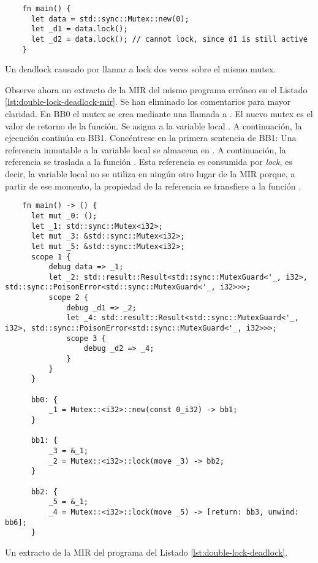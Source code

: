 \begin{listing}[!htb]
  \begin{verbatim}
    fn main() {
      let data = std::sync::Mutex::new(0);
      let _d1 = data.lock();
      let _d2 = data.lock(); // cannot lock, since d1 is still active
    }
  \end{verbatim}
  \caption{Un deadlock causado por llamar a lock dos veces sobre el mismo mutex.}
  \label{lst:double-lock-deadlock}
\end{listing}

Observe ahora un extracto de la \acrshort{MIR} del mismo programa erróneo en el Listado \ref{lst:double-lock-deadlock-mir}.
Se han eliminado los comentarios para mayor claridad. En BB0 el mutex se crea mediante una llamada
a . El nuevo mutex es el valor de retorno de la función. Se asigna a la
variable local . A continuación, la ejecución continúa en BB1. Concéntrese en la primera
sentencia de BB1: Una referencia inmutable a la variable local  se almacena en . A
continuación, la referencia se traslada a la función . Esta referencia es
consumida por \emph{lock}, es decir, la variable local  no se utiliza en ningún otro lugar de la \acrshort{MIR}
porque, a partir de ese momento, la propiedad de la referencia se transfiere a la función
.

\begin{listing}[!htb]
  \begin{verbatim}
    fn main() -> () {
      let mut _0: ();
      let _1: std::sync::Mutex<i32>;
      let mut _3: &std::sync::Mutex<i32>;
      let mut _5: &std::sync::Mutex<i32>;
      scope 1 {
          debug data => _1;
          let _2: std::result::Result<std::sync::MutexGuard<'_, i32>, std::sync::PoisonError<std::sync::MutexGuard<'_, i32>>>;
          scope 2 {
              debug _d1 => _2;
              let _4: std::result::Result<std::sync::MutexGuard<'_, i32>, std::sync::PoisonError<std::sync::MutexGuard<'_, i32>>>; 
              scope 3 {
                  debug _d2 => _4;
              }
          }
      }
  
      bb0: {
          _1 = Mutex::<i32>::new(const 0_i32) -> bb1;
      }
  
      bb1: {
          _3 = &_1;
          _2 = Mutex::<i32>::lock(move _3) -> bb2;
      }
  
      bb2: {
          _5 = &_1;
          _4 = Mutex::<i32>::lock(move _5) -> [return: bb3, unwind: bb6];
      }
  \end{verbatim}
  \caption{Un extracto de la MIR del programa del Listado \ref{lst:double-lock-deadlock}.}
  \label{lst:double-lock-deadlock-mir}
\end{listing}

